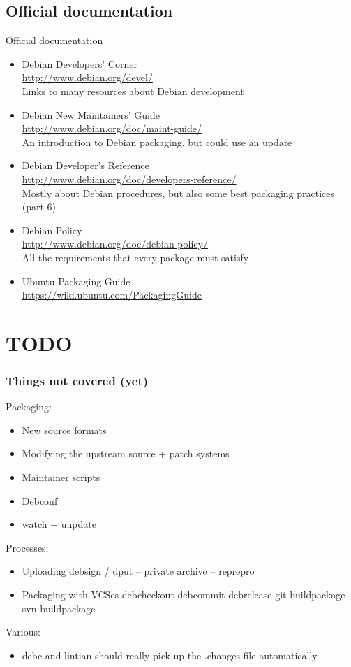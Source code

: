 \documentclass[10pt,final]{beamer}
\begin{document}
\subsection{Official documentation}
\begin{frame}{Official documentation}
	\begin{itemize}
		\item Debian Developers' Corner\\
			\url{http://www.debian.org/devel/}\\
			{\small Links to many resources about Debian development}
			\hbr
		\item Debian New Maintainers' Guide\\
			\url{http://www.debian.org/doc/maint-guide/}\\
			{\small An introduction to Debian packaging, but could use an update}
			\hbr
		\item Debian Developer's Reference\\
		      \url{http://www.debian.org/doc/developers-reference/}\\
		      {\small Mostly about Debian procedures, but also some best packaging practices (part 6)}
			\hbr

	      \item Debian Policy\\
		    \url{http://www.debian.org/doc/debian-policy/}\\
		    {\small All the requirements that every package must satisfy}
			\hbr

		\item Ubuntu Packaging Guide\\
			\url{https://wiki.ubuntu.com/PackagingGuide}
	\end{itemize}
\end{frame}

\section{TODO}
\begin{frame}
	\frametitle{Things not covered (yet)}
Packaging:
\begin{itemize}
\item New source formats
\item Modifying the upstream source + patch systems
\item Maintainer scripts
\item Debconf
\item watch + uupdate
\end{itemize}
Processes:
\begin{itemize}
\item Uploading debsign / dput -- private archive -- reprepro
\item Packaging with VCSes debcheckout debcommit debrelease git-buildpackage svn-buildpackage
\end{itemize}
Various:
\begin{itemize}
\item debc and lintian should really pick-up the .changes file automatically
\end{itemize}
\end{frame}
\end{document}
